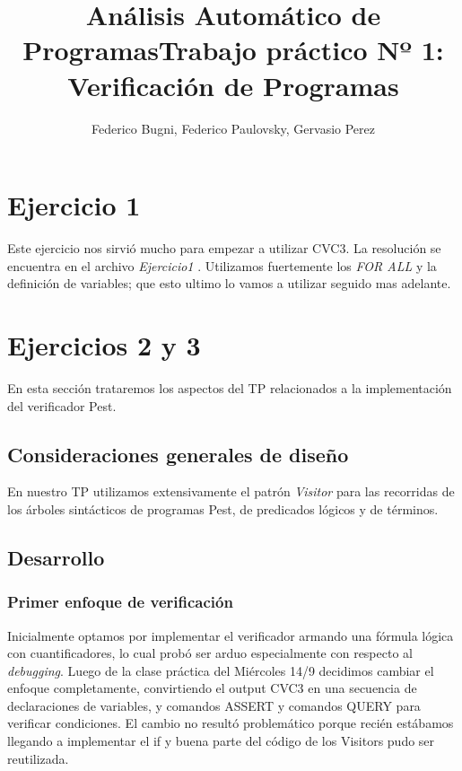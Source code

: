 \documentclass{article}
\author{Federico Bugni, Federico Paulovsky, Gervasio Perez}
\title{Análisis Automático de Programas}
\title{Trabajo práctico Nº 1: Verificación de Programas}
\begin{document}
\maketitle

\section{Ejercicio 1}

Este ejercicio nos sirvió mucho para empezar a utilizar CVC3. La resolución se encuentra en el archivo \textit{Ejercicio1} . Utilizamos fuertemente los \textit{FOR ALL} y la definición de variables; que esto ultimo lo vamos a utilizar seguido mas adelante.  

\section{Ejercicios 2 y 3}

En esta sección trataremos los aspectos del TP relacionados a la implementación del verificador Pest.

\subsection{Consideraciones generales de diseño}

En nuestro TP utilizamos extensivamente el patrón \textit{Visitor} para las recorridas de los árboles sintácticos de programas Pest, de predicados lógicos y de términos.

\subsection{Desarrollo}

\subsubsection{Primer enfoque de verificación}

Inicialmente optamos por implementar el verificador armando una fórmula lógica con cuantificadores, lo cual probó ser arduo especialmente con respecto al \textit{debugging}.
Luego de la clase práctica del Miércoles 14/9 decidimos cambiar el enfoque completamente, convirtiendo el output CVC3 en una secuencia de declaraciones de variables, y comandos ASSERT y comandos QUERY para verificar condiciones. El cambio no resultó problemático porque recién estábamos llegando a implementar el if y buena parte del código de los Visitors pudo ser reutilizada.
\end{document}
